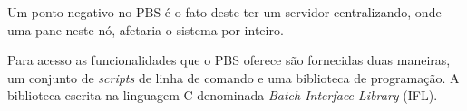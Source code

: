 Um ponto negativo no PBS é o fato deste ter um servidor centralizando, onde uma pane neste nó, afetaria o sistema por inteiro.

Para acesso as funcionalidades que o PBS oferece são fornecidas duas maneiras, um conjunto de \emph{scripts} de linha de comando e uma biblioteca de programação. A biblioteca escrita na linguagem C denominada \emph{Batch Interface Library} (IFL).